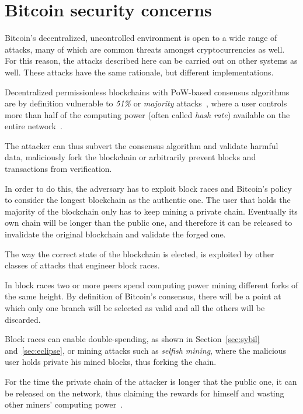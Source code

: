 \chapter{Bitcoin security concerns}
\label{sec:securityintro}

Bitcoin's decentralized, uncontrolled environment is open to a wide range of attacks, many of which are common threats amongst cryptocurrencies as well. For this reason, the attacks described here can be carried out on other systems as well. These attacks have the same rationale, but different implementations.\par

Decentralized permissionless blockchains with PoW-based consensus algorithms are by definition vulnerable to \textit{51\%} or \textit{majority} attacks~\cite{nakamoto}, where a user controls more than half of the computing power (often called \textit{hash rate}) available on the entire network~\cite{51atk}.

The attacker can thus subvert the consensus algorithm and validate harmful data, maliciously fork the blockchain or arbitrarily prevent blocks and transactions from verification.

In order to do this, the adversary has to exploit block races and Bitcoin's policy to consider the longest blockchain as the authentic one. The user that holds the majority of the blockchain only has to keep mining a private chain. Eventually its own chain will be longer than the public one, and therefore it can be released to invalidate the original blockchain and validate the forged one.\par

The way the correct state of the blockchain is elected, is exploited by other classes of attacks that engineer block races.

In block races two or more peers spend computing power mining different forks of the same height. By definition of Bitcoin's consensus, there will be a point at which only one branch will be selected as valid and all the others will be discarded.

Block races can enable double-spending, as shown in Section~\ref{sec:sybil} and~\ref{sec:eclipse}, or mining attacks such as \textit{selfish mining}, where the malicious user holds private his mined blocks, thus forking the chain.

For the time the private chain of the attacker is longer that the public one, it can be released on the network, thus claiming the rewards for himself and wasting other miners' computing power~\cite{selfishmining}.\par

